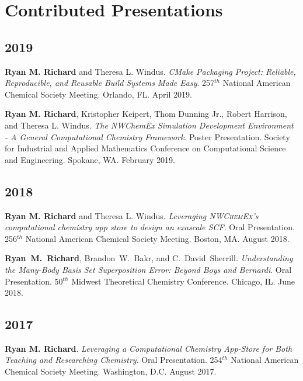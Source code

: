 \documentclass[11pt,a4paper,sans]{moderncv}
\begin{document}
\section{Contributed Presentations}
\vspace{5pt}
\begin{etaremune}
	\item[]{}
	\subsection{2019}
	\item{\textbf{Ryan M. Richard} and Theresa L. Windus. \textit{CMake 
	      Packaging Project: Reliable, Reproducible, and Reusable Build Systems
		  Made Easy}. 257$^{th}$ National American Chemical Society Meeting. 
		  Orlando, FL. April 2019.}
	\item{\textbf{Ryan M. Richard}, Kristopher Keipert, Thom Dunning Jr., 
	      Robert Harrison, and Theresa L. Windus. \textit{The NWChemEx 
		  Simulation Development Environment - A General Computational Chemistry
		  Framework}. Poster Presentation. Society for Industrial and Applied 
		  Mathematics Conference on Computational Science and Engineering. 
		  Spokane, WA. February 2019.}

	\subsection{2018}
	\item{\textbf{Ryan M. Richard} and Theresa L. Windus. \textit{Leveraging 
	      \textsc{NWChemEx}'s computational chemistry app store to design an 
		  exascale {SCF}}. Oral Presentation. 256$^{th}$ National American 
		  Chemical Society Meeting. Boston, MA. August 2018.}
	\item{\textbf{Ryan~M.~Richard}, Brandon~W.~Bakr, and C.~David~Sherrill. 
	      \textit{Understanding the Many-Body Basis Set Superposition Error: 
		  Beyond Boys and Bernardi}.  Oral Presentation. 50$^{th}$ Midwest 
		  Theoretical Chemistry Conference. Chicago, IL. June 2018.}
	
	\subsection{2017}
	\item{\textbf{Ryan M. Richard}. \textit{Leveraging a Computational Chemistry
	      App-Store for Both Teaching and Researching Chemistry}. Oral 
		  Presentation. 254$^{th}$ National American Chemical Society Meeting.  
		  Washington, D.C. August 2017.}
	

\end{etaremune}
\end{document}
